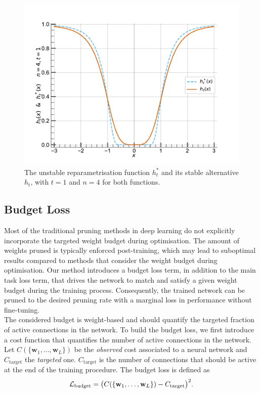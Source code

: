 \begin{figure}
  \centering
  \centerline{\includegraphics[width=0.49\linewidth]{chapter_1/assets/h_stable_vs_unstable.pdf}}
  \caption{ The unstable reparametrisation function $h_t^*$ and its
  stable alternative $h_t$, with $t=1$ and $n=4$ for both functions.} 
  \label{fig:chap1:h_stable_vs_unstable}
\end{figure}

\subsection{Budget Loss}
\label{sec:chap1:budget_loss}
Most of the traditional pruning methods in deep learning do not explicitly
incorporate the targeted weight budget during optimisation. The amount of
weights pruned is typically enforced post-training, which may lead to suboptimal
results compared to methods that consider the weight budget during optimisation.
Our method introduces a budget loss term, in addition to the main task loss
term, that drives the network to match and satisfy a given weight budget during
the training process. Consequently, the trained network can be pruned to the
desired pruning rate with a marginal loss in performance without fine-tuning.\\


The considered budget is weight-based and should quantify the targeted fraction
of active connections in the network. To build the budget loss, we first
introduce a cost function that quantifies the number of active connections in
the network. Let $C(\{\mathbf{w}_1,\dots, \mathbf{w}_L\})$ be the {\em observed}
cost associated to a neural network and $C_\text{target}$ the {\em targeted}
one. $C_\text{target}$ is the number of connections that should be active at the
end of the training procedure. The budget loss is defined as \\

\begin{equation}
  \label{eqn:chap1:simple_budget}
  {\cal L}_\text{budget} = \bigl( C(\{\mathbf{w}_1,\dots, \mathbf{w}_L\}) - C_\text{target} \bigr)^2.
\end{equation} \\


